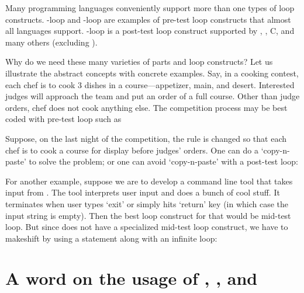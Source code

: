 Many programming languages conveniently support more than one types of loop constructs.
-loop and -loop are examples of pre-test loop constructs that
almost all languages support.
-loop is a post-test loop construct supported by \java, \cpp, C, and many
others (excluding \python).


Why do we need these many varieties of parts and loop constructs?
Let us illustrate the abstract concepts with concrete examples.
Say, in a cooking contest, each chef is to cook 3 dishes in a course---appetizer, main,
and desert.
Interested judges will approach the team and put an order of a full course.
Other than judge orders, chef does not cook anything else.
The competition process may be best coded with pre-test loop such as



Suppose, on the last night of the competition, the rule is changed so that each chef is to cook a
course for display before judges' orders.
One can do a `copy-n-paste' to solve the problem;
or one can avoid `copy-n-paste' with a post-test loop:



For another example, suppose we are to develop a command line tool that takes input from
.
The tool interprets user input and does a bunch of cool stuff.
It terminates when user types `exit' or simply hits `return' key
(in which case the input string is empty).
Then the best loop construct for that would be mid-test loop.
But since \java does not have a specialized mid-test loop construct, we have to makeshift by using
a  statement along with an infinite loop:



\section{A word on the usage of , , and }
\label{sec:continue-and-break}

